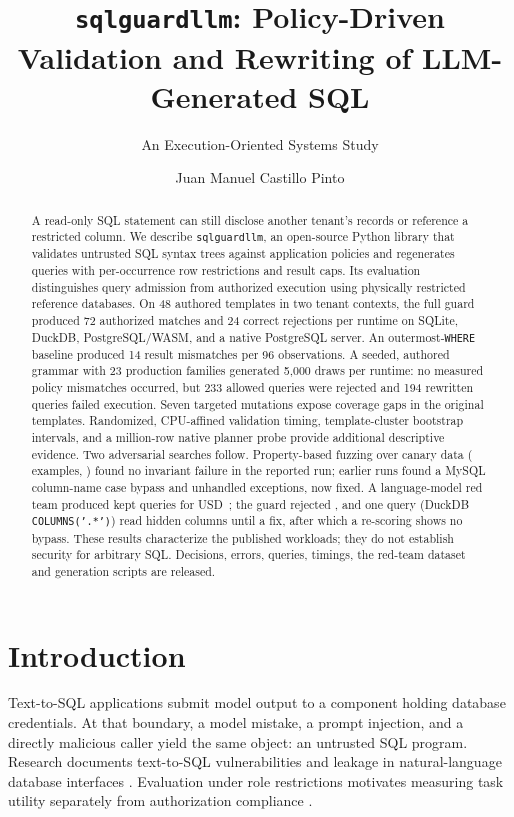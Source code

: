 \documentclass[sigconf,nonacm,natbib=false]{acmart}
\title{\texttt{sqlguardllm}: Policy-Driven Validation and Rewriting of LLM-Generated SQL}
\subtitle{An Execution-Oriented Systems Study}
\author{Juan Manuel Castillo Pinto}
\begin{document}
\begin{abstract}
A read-only SQL statement can still disclose another tenant's records or
reference a restricted column. We describe \texttt{sqlguardllm}, an open-source
Python library that validates untrusted SQL syntax trees against application
policies and regenerates queries with per-occurrence row restrictions and
result caps. Its evaluation distinguishes query admission from authorized
execution using physically restricted reference databases. On 48 authored
templates in two tenant contexts, the full guard produced 72 authorized
matches and 24 correct rejections per runtime on SQLite, DuckDB, PostgreSQL/WASM,
and a native PostgreSQL server. An outermost-\texttt{WHERE} baseline produced
14 result mismatches per 96 observations. A seeded, authored grammar with
23 production families generated 5,000 draws per runtime: no measured policy
mismatches occurred, but 233 allowed queries were rejected and 194 rewritten
queries failed execution. Seven targeted mutations expose coverage gaps in
the original templates. Randomized, CPU-affined validation timing,
template-cluster bootstrap intervals, and a million-row native planner probe
provide additional descriptive evidence. Two adversarial searches follow.
Property-based fuzzing over canary data (\CFExamples{} examples, \CFEngines{})
found no invariant failure in the reported run; earlier runs found a MySQL
column-name case bypass and unhandled exceptions, now fixed. A language-model
red team produced \RTAttacks{} kept queries for USD~\RTCost{}; the guard
rejected \RTRejected{}, and one query (DuckDB \texttt{COLUMNS('.*')}) read
hidden columns until a fix, after which a re-scoring shows no bypass. These results
characterize the published workloads; they do not establish security for
arbitrary SQL. Decisions, errors, queries, timings, the red-team dataset and
generation scripts are released.
\end{abstract}
\maketitle

\section{Introduction}
Text-to-SQL applications submit model output to a component holding database
credentials. At that boundary, a model mistake, a prompt injection, and a
directly malicious caller yield the same object: an untrusted SQL program.
Research documents text-to-SQL vulnerabilities \cite{peng2024security} and
leakage in natural-language database interfaces \cite{song2024securesql}.
Evaluation under role restrictions motivates measuring task utility separately
from authorization compliance \cite{fei2026rbac}.
\end{document}
